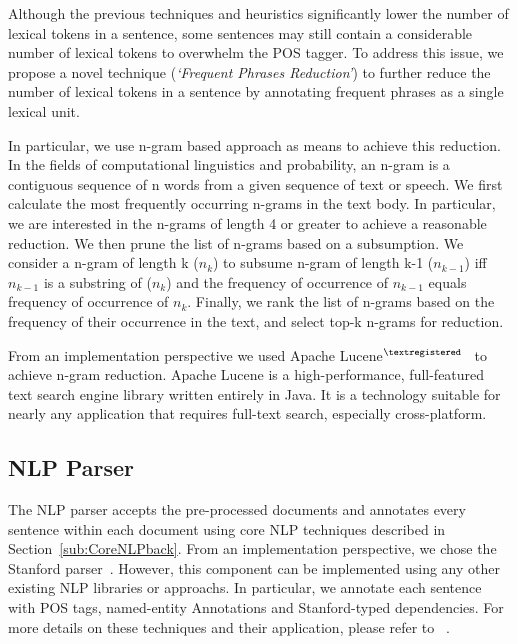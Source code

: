 Although the previous techniques and heuristics significantly lower the number of lexical tokens in a sentence, some sentences may still contain a considerable number of lexical tokens to overwhelm the POS tagger.
To address this issue, we propose a novel technique (\textit{`Frequent Phrases Reduction'}) to further reduce the number of lexical tokens in a sentence by annotating frequent phrases as a single lexical unit.

In particular, we use n-gram based approach as means to achieve this reduction. 
In the fields of computational linguistics and probability, an n-gram is a contiguous sequence of n words from a given sequence of text or speech. 
We first calculate the most frequently occurring n-grams in the text body. 
In particular, we are interested in the n-grams of length 4 or greater to achieve a reasonable reduction. 
We then prune the list of n-grams based on a subsumption. 
We consider a n-gram of length k ($n_k$) to subsume n-gram of length k-1 ($n_{k-1}$) iff $n_{k-1}$ is a substring of ($n_k$) and the frequency of occurrence of $n_{k-1}$ equals frequency of occurrence of $n_{k}$.
Finally, we rank the list of n-grams based on the frequency of their occurrence in the text, and select top-k n-grams for reduction.
 
From an implementation perspective we used Apache Lucene$^{\textregistered}$~\cite{lucene} to achieve n-gram reduction.
Apache Lucene is a high-performance, full-featured text search engine library written entirely in Java.
It is a technology suitable for nearly any application that requires full-text search, especially cross-platform.

	
\subsection{NLP Parser}


The NLP parser accepts the pre-processed documents and annotates every sentence within each document using core NLP techniques described in Section~\ref{sub:CoreNLPback}.
From an implementation perspective, we chose the Stanford parser~\cite{SNLP}.
However, this component can be implemented using any other existing NLP libraries or approachs.
In particular, we annotate each sentence with POS tags, named-entity Annotations and Stanford-typed dependencies.
For more details on these techniques and their application, please refer to ~\cite{Marneffe06LREC, Marneffe08COLING, pandita12:inferring, pandita13:WHYPER, thummalapentaICSE12}.

